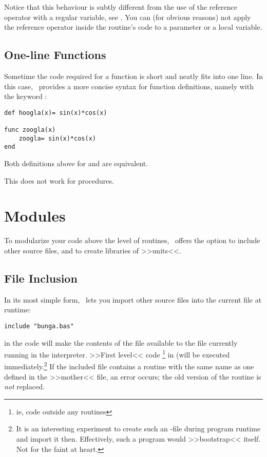 Notice that this behaviour is subtly different from the use of the
reference operator \Co{\at} with a regular variable, see
. You can (for obvious reasons) not apply the
reference operator inside the routine's code to a parameter or a local
variable.

\subsection{One-line Functions}

Sometime the code required for a function is short and neatly fits into
one line. In this case, \SB\ provides a more concise syntax for function
definitions, namely with the keyword :

\begin{lstlisting}
def hoogla(x)= sin(x)*cos(x)

func zoogla(x)
	zoogla= sin(x)*cos(x)
end
\end{lstlisting}

Both definitions above for  and  are equivalent.

This does not work for procedures.

\section{Modules \label{modules}}

To modularize your code above the level of routines, \SB\ offers the
option to include other source files, and to create libraries of
>>units<<.

\subsection{File Inclusion}

In its most simple form, \SB\ lets you import other source files into
the current file at runtime:

\begin{lstlisting}
include "bunga.bas"
\end{lstlisting}

in the code will make the contents of the file  available
to the file currently running in the interpreter. >>First level<< code
\footnote{ie, code outside any routines} in  (will be
executed immediately.\footnote{It is an interesting experiment to create
such an -file during program runtime and import it then.
Effectively, such a program would >>bootstrap<< itself. Not for the
faint at heart.} If the included file contains a routine with the same
name as one defined in the >>mother<< file, an error occurs; the old
version of the routine is \emph{not} replaced.

